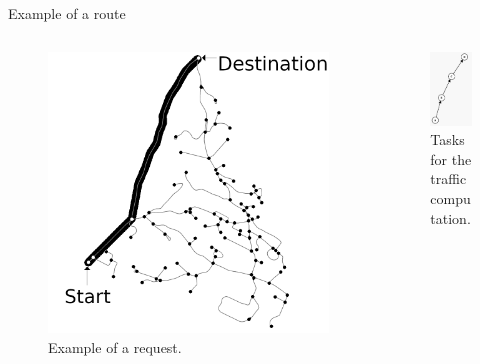 \documentclass[Ligatures=TeX,table,svgnames,usetotalslideindicator,compress,10pt,aspectratio=169]{beamer}
\begin{document}
\begin{frame}{Example of a route} 
\begin{columns}        
  
\begin{column}{0.5\textwidth}

 \begin{figure}[]
        
        \includegraphics[width=\textwidth]{images/path_2.png}
        \caption{Example of a request.}
      \end{figure}
\end{column}
\begin{column}{0.5\textwidth}

   \begin{figure}[!h]
        \centering
        \includegraphics[width=.5\textwidth]{images/DAG_1.png}
        \caption{Tasks for the traffic computation.}
      \end{figure}
      

\end{column}
\end{columns}
\end{frame}
\end{document}
